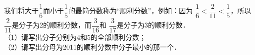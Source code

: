 我们将大于$\dfrac{1}{6}$而小于$\dfrac{1}{5}$的最简分数称为“顺利分数”，例如：因为
$\dfrac{1}{6}<\dfrac{2}{11}<\dfrac{1}{5}$，所以$\dfrac{2}{11}$是分子为2的顺利分数，而$\dfrac{3}{16}$和
$\dfrac{3}{17}$是分子为3的顺利分数．\\
（1）请写出分子分别为4和5的全部顺利分数；\\
（2）请写出分母为2011的顺利分数中分子最小的那一个．